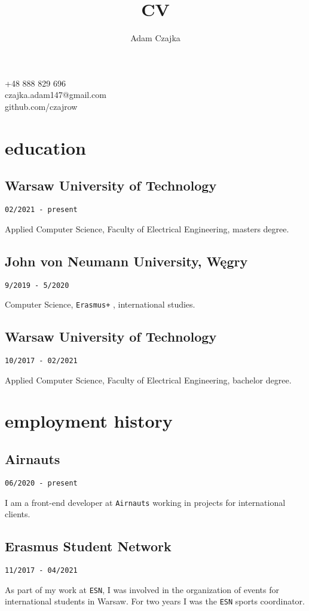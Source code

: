 \documentclass{article}
\makeatletter
\renewcommand{\maketitle}{
    \begin{center}



        {\huge\bfseries\theauthor}

        \vspace{.25em}

        +48 888 829 696\\czajka.adam147@gmail.com\\github.com/czajrow
	\end{center}
	\vspace{-.5cm}
}
\makeatother
\begin{document}
\title{CV}
\author{Adam Czajka}

\maketitle

\vspace{2em}

\begin{minipage}[t]{.5\textwidth}
	\section{education}

    \subsection{Warsaw University of Technology}
	\texttt{02/2021 - present}
	\par Applied Computer Science, Faculty of Electrical Engineering, masters degree.

    \subsection{John von Neumann University, Węgry}
	\texttt{9/2019 - 5/2020}
	\par Computer Science, \texttt{Erasmus+} , international studies.

	\subsection{Warsaw University of Technology}
	\texttt{10/2017 - 02/2021}
	\par Applied Computer Science, Faculty of Electrical Engineering, bachelor degree.

	\vspace{2em}

	\section{employment history}

    \subsection{Airnauts}
	\texttt{06/2020 - present}
	\par I am a front-end developer at \texttt{Airnauts} working in projects for international clients.


	\subsection{Erasmus Student Network}
	\texttt{11/2017 - 04/2021}
	\par As part of my work at \texttt{ESN}, I was involved in the organization of events for international students in Warsaw. For two years I was the \texttt{ESN} sports coordinator.


\end{minipage}
\end{document}
